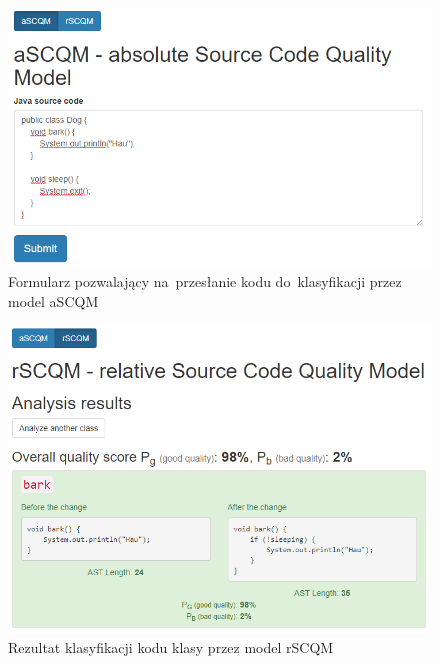 \documentclass[twoside]{praca}
\begin{document}
\begin{figure}[h!]
\centering
\includegraphics[width=\textwidth]{eval/ascqm-form.png}
\caption{Formularz pozwalający na~przesłanie kodu do~klasyfikacji przez model aSCQM}
\label{fig:eval:ascqm-form}
\end{figure}

\begin{figure}[H]
\centering
\includegraphics[width=\textwidth]{eval/rscqm-result.png}
\caption{Rezultat klasyfikacji kodu klasy przez model rSCQM}
\label{fig:eval:rscqm-result}
\end{figure}
\end{document}
